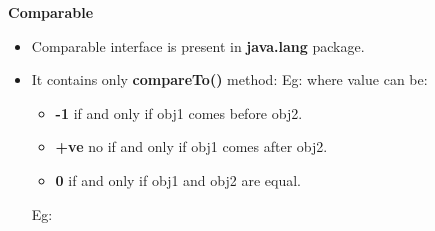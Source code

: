 \setlength{\columnsep}{3pt}
\begin{flushleft}
	
	\textbf{Comparable}
	
	\begin{itemize}
		\item Comparable interface is present in \textbf{java.lang} package.
		\item It contains only \textbf{compareTo()} method:
		Eg:
		where value can be:
		\begin{itemize}
			\item \textbf{-1} if and only if obj1 comes before obj2.
			\item \textbf{+ve} no if and only if obj1 comes after obj2.
			\item \textbf{0} if and only if obj1 and obj2 are equal.
		\end{itemize}
	
		Eg:
		\bigskip
		
	\end{itemize}
	
	\newpage
	

\end{flushleft}
